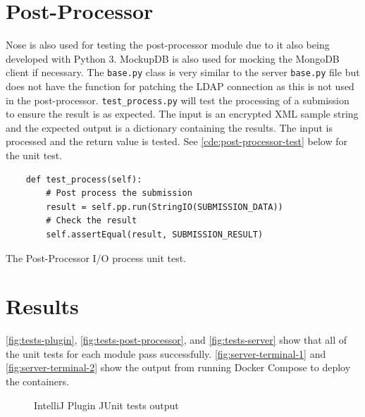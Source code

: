 \section{Post-Processor}
Nose is also used for testing the post-processor module due to it also being developed with Python 3. MockupDB is also used for mocking the MongoDB client if necessary. The \texttt{base.py} class is very similar to the server \texttt{base.py} file but does not have the function for patching the LDAP connection as this is not used in the post-processor. \texttt{test\_process.py} will test the processing of a submission to ensure the result is as expected. The input is an encrypted XML sample string and the expected output is a dictionary containing the results. The input is processed and the return value is tested. See \autoref{cde:post-processor-test} below for the unit test.

\begin{code}
\begin{verbatim}
    def test_process(self):
        # Post process the submission
        result = self.pp.run(StringIO(SUBMISSION_DATA))
        # Check the result
        self.assertEqual(result, SUBMISSION_RESULT)
\end{verbatim}
\caption[Post-Processor test]{The Post-Processor I/O process unit test.}
\label{cde:post-processor-test}
\end{code}

\newpage

\section{Results}
\autoref{fig:tests-plugin}, \autoref{fig:tests-post-processor}, and \autoref{fig:tests-server} show that all of the unit tests for each module pass successfully. \autoref{fig:server-terminal-1} and \autoref{fig:server-terminal-2} show the output from running Docker Compose to deploy the containers.

\begin{figure}[H]
  \centering
  \caption[Plugin tests]{IntelliJ Plugin JUnit tests output}
  \label{fig:tests-plugin}
\end{figure}

